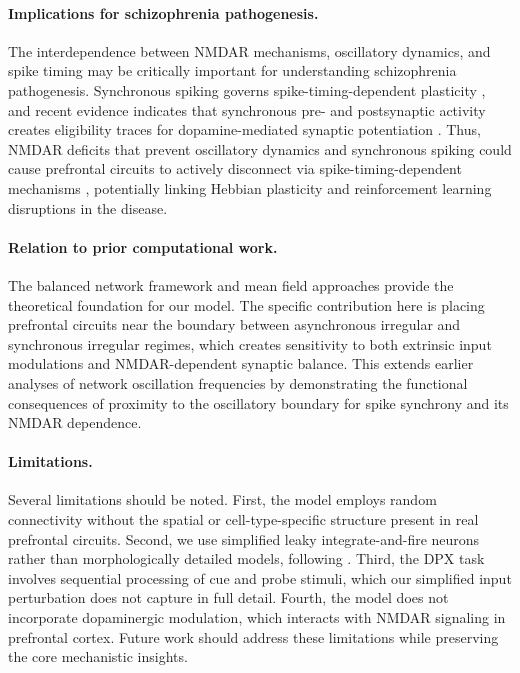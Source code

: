 \documentclass[10pt]{article}
\begin{document}
\paragraph{Implications for schizophrenia pathogenesis.}
The interdependence between NMDAR mechanisms, oscillatory dynamics, and
spike timing may be critically important for understanding schizophrenia
pathogenesis. Synchronous spiking governs spike-timing-dependent plasticity
\citep{dan2004spike}, and recent evidence indicates that synchronous pre-
and postsynaptic activity creates eligibility traces for dopamine-mediated
synaptic potentiation \citep{he2015eligibility, yagishita2014critical}.
Thus, NMDAR deficits that prevent oscillatory dynamics and synchronous
spiking could cause prefrontal circuits to actively disconnect via
spike-timing-dependent mechanisms \citep{zick2021disparate}, potentially
linking Hebbian plasticity and reinforcement learning disruptions in the
disease.

\paragraph{Relation to prior computational work.}
The balanced network framework \citep{vanvreeswijk1996chaos,
brunel2000dynamics, renart2010asynchronous} and mean field approaches
\citep{amit1997model, brunel2001effects} provide the theoretical foundation
for our model. The specific contribution here is placing prefrontal circuits
near the boundary between asynchronous irregular and synchronous irregular
regimes, which creates sensitivity to both extrinsic input modulations and
NMDAR-dependent synaptic balance. This extends earlier analyses of network
oscillation frequencies \citep{brunel2003fast, brunel1999fast} by
demonstrating the functional consequences of proximity to the oscillatory
boundary for spike synchrony and its NMDAR dependence.

\paragraph{Limitations.}
Several limitations should be noted. First, the model employs random
connectivity without the spatial or cell-type-specific structure present in
real prefrontal circuits. Second, we use simplified leaky integrate-and-fire
neurons rather than morphologically detailed models, following
\citet{dayan2001theoretical, brunel2000dynamics}. Third, the DPX task
involves sequential processing of cue and probe stimuli, which our simplified
input perturbation does not capture in full detail. Fourth, the model does
not incorporate dopaminergic modulation, which interacts with NMDAR signaling
in prefrontal cortex. Future work should address these limitations while
preserving the core mechanistic insights.
\end{document}
